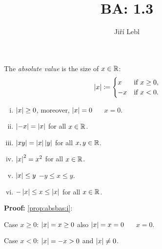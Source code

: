 \documentclass[10pt,aspectratio=149]{beamer}
\author{Ji\v{r}\'i Lebl}
\institute[OSU]{%
Departemento pri Matematiko de Oklahoma {\^S}tata Universitato}
\title{BA: 1.3}
\date{}
\begin{document}
\begin{frame}
\titlepage
\end{frame}

\begin{frame}
The \emph{absolute value} is the size of $x \in {\mathbb{R}}$:
\[
\left\lvert {x} \right\rvert \coloneqq
\begin{cases}
x & \text{if } x \geq 0, \\
-x & \text{if } x < 0 .
\end{cases}
\]

\pause

\begin{proposition}
\begin{enumerate}[(i)]
\item \label{prop:absbas:i} $\left\lvert {x} \right\rvert \geq 0$, \quad moreover, $\left\lvert {x} \right\rvert=0$ ~\iffif~ $x = 0$.
\item \pause \label{prop:absbas:ii} $\left\lvert {-x} \right\rvert = \left\lvert {x} \right\rvert$ \quad for all $x \in {\mathbb{R}}$.
\item \pause \label{prop:absbas:iii} $\left\lvert {xy} \right\rvert = \left\lvert {x} \right\rvert\left\lvert {y} \right\rvert$ \quad for all $x,y \in {\mathbb{R}}$.
\item \pause \label{prop:absbas:iv} $\left\lvert {x} \right\rvert^2 = x^2$ \quad for all $x \in {\mathbb{R}}$.
\item \pause \label{prop:absbas:v} $\left\lvert {x} \right\rvert \leq y$ \wiffif $-y \leq x \leq y$.
\item \pause \label{prop:absbas:vi} $-\left\lvert {x} \right\rvert \leq x \leq \left\lvert {x} \right\rvert$ \quad for all $x \in {\mathbb{R}}$.
\end{enumerate}
\end{proposition}

\pause

\textbf{Proof:}
\eqref{prop:absbas:i}:

Case $x \geq 0$:
\quad
\pause
$\left\lvert {x} \right\rvert = x \geq 0$
\quad
\pause
also $\left\lvert {x} \right\rvert = x = 0$ ~\iffif~ $x=0$.

\pause
Case $x < 0$:
\quad
$\left\lvert {x} \right\rvert = -x > 0$ \quad \pause and $\left\lvert {x} \right\rvert \not= 0$.

\end{frame}
\end{document}
